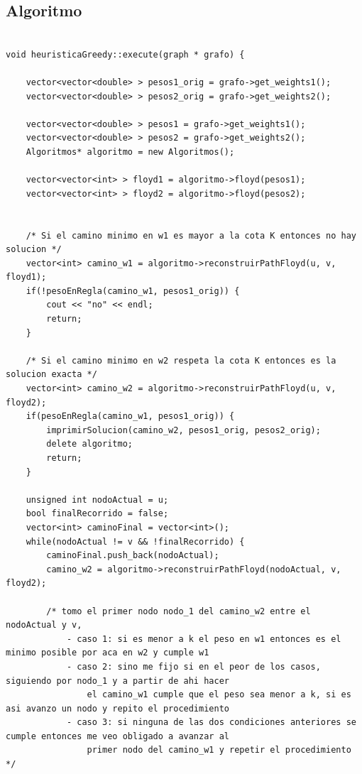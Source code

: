 \newpage
\subsection{Algoritmo}
\begin{lstlisting}

void heuristicaGreedy::execute(graph * grafo) {

	vector<vector<double> > pesos1_orig = grafo->get_weights1();
	vector<vector<double> > pesos2_orig = grafo->get_weights2();

	vector<vector<double> > pesos1 = grafo->get_weights1();
	vector<vector<double> > pesos2 = grafo->get_weights2();
	Algoritmos* algoritmo = new Algoritmos();

	vector<vector<int> > floyd1 = algoritmo->floyd(pesos1);
	vector<vector<int> > floyd2 = algoritmo->floyd(pesos2);
	

	/* Si el camino minimo en w1 es mayor a la cota K entonces no hay solucion */
	vector<int> camino_w1 = algoritmo->reconstruirPathFloyd(u, v, floyd1);
	if(!pesoEnRegla(camino_w1, pesos1_orig)) {
		cout << "no" << endl;
		return;
	}

	/* Si el camino minimo en w2 respeta la cota K entonces es la solucion exacta */
	vector<int> camino_w2 = algoritmo->reconstruirPathFloyd(u, v, floyd2);
	if(pesoEnRegla(camino_w1, pesos1_orig)) {
		imprimirSolucion(camino_w2, pesos1_orig, pesos2_orig);
		delete algoritmo;
		return;
	}

	unsigned int nodoActual = u;
	bool finalRecorrido = false;
	vector<int> caminoFinal = vector<int>();
	while(nodoActual != v && !finalRecorrido) {
		caminoFinal.push_back(nodoActual);
		camino_w2 = algoritmo->reconstruirPathFloyd(nodoActual, v, floyd2);

		/* tomo el primer nodo nodo_1 del camino_w2 entre el nodoActual y v, 
			- caso 1: si es menor a k el peso en w1 entonces es el minimo posible por aca en w2 y cumple w1 
		 	- caso 2: sino me fijo si en el peor de los casos, siguiendo por nodo_1 y a partir de ahi hacer
		 		el camino_w1 cumple que el peso sea menor a k, si es asi avanzo un nodo y repito el procedimiento
		 	- caso 3: si ninguna de las dos condiciones anteriores se cumple entonces me veo obligado a avanzar al
		 		primer nodo del camino_w1 y repetir el procedimiento */


\end{lstlisting}
